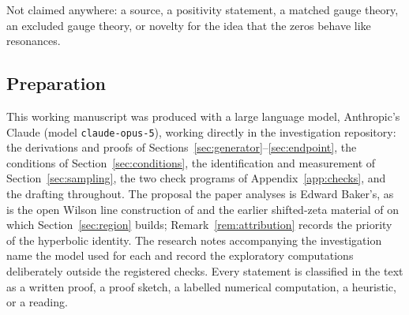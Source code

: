 Not claimed anywhere: a source, a positivity statement, a matched gauge theory,
an excluded gauge theory, or novelty for the idea that the zeros behave like
resonances.

\subsection*{Preparation}

This working manuscript was produced with a large language model, Anthropic's
Claude (model \texttt{claude-opus-5}), working directly in the investigation
repository: the derivations and proofs of
Sections~\ref{sec:generator}--\ref{sec:endpoint}, the conditions of
Section~\ref{sec:conditions}, the identification and measurement of
Section~\ref{sec:sampling}, the two check programs of Appendix~\ref{app:checks},
and the drafting throughout. The proposal the paper analyses is Edward Baker's, as is
the open Wilson line construction of \cite{OWL} and the earlier shifted-zeta
material of \cite{CriticalPath,CumulativePath} on which Section~\ref{sec:region}
builds; Remark~\ref{rem:attribution} records the priority of the hyperbolic
identity. The research notes accompanying the investigation name the model used
for each and record the exploratory computations deliberately outside the
registered checks. Every statement is classified in the text as a written proof,
a proof sketch, a labelled numerical computation, a heuristic, or a reading.
